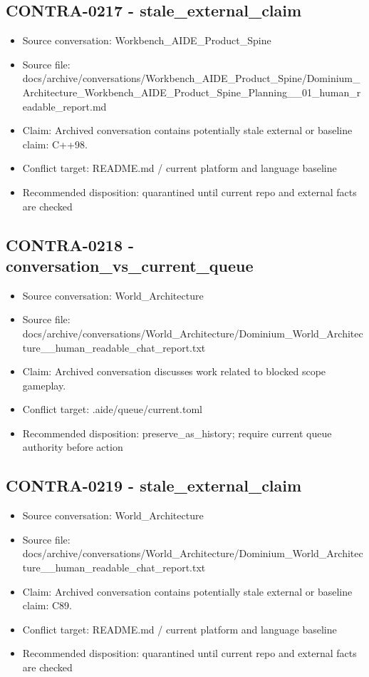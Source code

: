 \documentclass[11pt,a4paper]{report}
\begin{document}
\subsection{CONTRA-0217 - stale\_external\_claim}

\begin{itemize}
\item Source conversation: Workbench\_AIDE\_Product\_Spine
\item Source file: docs/archive/conversations/Workbench\_AIDE\_Product\_Spine/Dominium\_Architecture\_Workbench\_AIDE\_Product\_Spine\_Planning\_\_01\_human\_readable\_report.md
\item Claim: Archived conversation contains potentially stale external or baseline claim: C++98.
\item Conflict target: README.md / current platform and language baseline
\item Recommended disposition: quarantined until current repo and external facts are checked
\end{itemize}

\subsection{CONTRA-0218 - conversation\_vs\_current\_queue}

\begin{itemize}
\item Source conversation: World\_Architecture
\item Source file: docs/archive/conversations/World\_Architecture/Dominium\_World\_Architecture\_\_human\_readable\_chat\_report.txt
\item Claim: Archived conversation discusses work related to blocked scope gameplay.
\item Conflict target: .aide/queue/current.toml
\item Recommended disposition: preserve\_as\_history; require current queue authority before action
\end{itemize}

\subsection{CONTRA-0219 - stale\_external\_claim}

\begin{itemize}
\item Source conversation: World\_Architecture
\item Source file: docs/archive/conversations/World\_Architecture/Dominium\_World\_Architecture\_\_human\_readable\_chat\_report.txt
\item Claim: Archived conversation contains potentially stale external or baseline claim: C89.
\item Conflict target: README.md / current platform and language baseline
\item Recommended disposition: quarantined until current repo and external facts are checked
\end{itemize}
\end{document}
